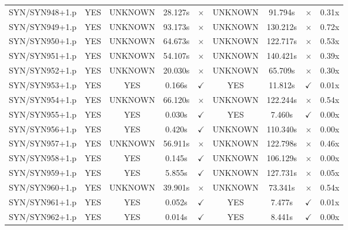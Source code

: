 \documentclass[a4paper,10pt]{article}
\begin{document}
\begin{longtable}{lcccccccc}
SYN/SYN948+1.p & YES & UNKNOWN & 28.127s & \cellcolor{mismatchcolor}$\times$ & UNKNOWN & 91.794s & \cellcolor{mismatchcolor}$\times$ & 0.31x \\
SYN/SYN949+1.p & YES & UNKNOWN & 93.173s & \cellcolor{mismatchcolor}$\times$ & UNKNOWN & 130.212s & \cellcolor{mismatchcolor}$\times$ & 0.72x \\
SYN/SYN950+1.p & YES & UNKNOWN & 64.673s & \cellcolor{mismatchcolor}$\times$ & UNKNOWN & 122.717s & \cellcolor{mismatchcolor}$\times$ & 0.53x \\
SYN/SYN951+1.p & YES & UNKNOWN & 54.107s & \cellcolor{mismatchcolor}$\times$ & UNKNOWN & 140.421s & \cellcolor{mismatchcolor}$\times$ & 0.39x \\
SYN/SYN952+1.p & YES & UNKNOWN & 20.030s & \cellcolor{mismatchcolor}$\times$ & UNKNOWN & 65.709s & \cellcolor{mismatchcolor}$\times$ & 0.30x \\
SYN/SYN953+1.p & YES & YES & 0.166s & \cellcolor{matchcolor}$\checkmark$ & YES & 11.812s & \cellcolor{matchcolor}$\checkmark$ & 0.01x \\
SYN/SYN954+1.p & YES & UNKNOWN & 66.120s & \cellcolor{mismatchcolor}$\times$ & UNKNOWN & 122.244s & \cellcolor{mismatchcolor}$\times$ & 0.54x \\
SYN/SYN955+1.p & YES & YES & 0.030s & \cellcolor{matchcolor}$\checkmark$ & YES & 7.460s & \cellcolor{matchcolor}$\checkmark$ & 0.00x \\
SYN/SYN956+1.p & YES & YES & 0.420s & \cellcolor{matchcolor}$\checkmark$ & UNKNOWN & 110.340s & \cellcolor{mismatchcolor}$\times$ & 0.00x \\
SYN/SYN957+1.p & YES & UNKNOWN & 56.911s & \cellcolor{mismatchcolor}$\times$ & UNKNOWN & 122.798s & \cellcolor{mismatchcolor}$\times$ & 0.46x \\
SYN/SYN958+1.p & YES & YES & 0.145s & \cellcolor{matchcolor}$\checkmark$ & UNKNOWN & 106.129s & \cellcolor{mismatchcolor}$\times$ & 0.00x \\
SYN/SYN959+1.p & YES & YES & 5.855s & \cellcolor{matchcolor}$\checkmark$ & UNKNOWN & 127.731s & \cellcolor{mismatchcolor}$\times$ & 0.05x \\
SYN/SYN960+1.p & YES & UNKNOWN & 39.901s & \cellcolor{mismatchcolor}$\times$ & UNKNOWN & 73.341s & \cellcolor{mismatchcolor}$\times$ & 0.54x \\
SYN/SYN961+1.p & YES & YES & 0.052s & \cellcolor{matchcolor}$\checkmark$ & YES & 7.477s & \cellcolor{matchcolor}$\checkmark$ & 0.01x \\
SYN/SYN962+1.p & YES & YES & 0.014s & \cellcolor{matchcolor}$\checkmark$ & YES & 8.441s & \cellcolor{matchcolor}$\checkmark$ & 0.00x \\

\end{longtable}
\end{document}
